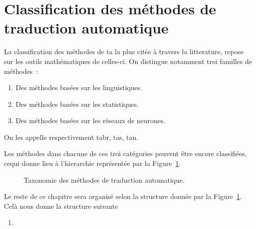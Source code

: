\section{Classification des méthodes de traduction automatique}

La classification des méthodes de \acrshort{ta} la plus citée à travers la litterature, 
repose sur les outils mathématiques de celles-ci.
On distingue notamment troi familles de méthodes~\cite{deep-nmt-survey}:
\begin{enumerate}
    \item Des méthodes basées sur les linguistiques.
    \item Des méthodes basées sur les statistiques.
    \item Des méthodes basées sur les réseaux de neurones.
\end{enumerate}

On les appelle respectivement \Acrfull{tabr}, \Acrfull{tas}, \Acrfull{tan}.

Les méthodes dans chacune de ces troi catégories peuvent être encore classifiées,
cequi donne lieu à l'hierarchie représentée par la Figure~\ref{fig:mt-taxonomy-tree}.

\begin{figure}
    \begin{center}
       \resizebox{\textwidth}{!}{
         
       }
    \end{center}
    \caption{Taxonomie des méthodes de traduction automatique.}
    \label{fig:mt-taxonomy-tree}
\end{figure}

Le reste de ce chapitre sera organisé selon la structure donnée par la Figure~\ref{fig:mt-taxonomy-tree}. 
Celà nous donne la structure suivante

\begin{enumerate}
    \item 
\end{enumerate}
